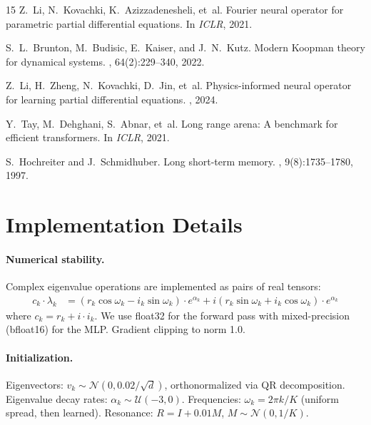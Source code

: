 \documentclass{article}
\begin{document}
\begin{thebibliography}{15}
Z.~Li, N.~Kovachki, K.~Azizzadenesheli, et~al.
\newblock Fourier neural operator for parametric partial differential equations.
\newblock In {\em ICLR}, 2021.

S.~L.~Brunton, M.~Budisic, E.~Kaiser, and J.~N.~Kutz.
\newblock Modern {K}oopman theory for dynamical systems.
, 64(2):229--340, 2022.

Z.~Li, H.~Zheng, N.~Kovachki, D.~Jin, et~al.
\newblock Physics-informed neural operator for learning partial differential equations.
, 2024.

Y.~Tay, M.~Dehghani, S.~Abnar, et~al.
\newblock Long range arena: A benchmark for efficient transformers.
\newblock In {\em ICLR}, 2021.

S.~Hochreiter and J.~Schmidhuber.
\newblock Long short-term memory.
, 9(8):1735--1780, 1997.

\end{thebibliography}

\newpage
\appendix

\section{Implementation Details}
\label{app:implementation}

\paragraph{Numerical stability.}
Complex eigenvalue operations are implemented as pairs of real tensors:
\begin{align}
c_k \cdot \lambda_k &= (r_k \cos\omega_k - i_k \sin\omega_k) \cdot e^{\alpha_k} + i(r_k \sin\omega_k + i_k \cos\omega_k) \cdot e^{\alpha_k}
\end{align}
where $c_k = r_k + i \cdot i_k$. We use float32 for the forward pass with mixed-precision (bfloat16) for the MLP. Gradient clipping to norm 1.0.

\paragraph{Initialization.}
Eigenvectors: $v_k \sim \mathcal{N}(0, 0.02/\sqrt{d})$, orthonormalized via QR decomposition. Eigenvalue decay rates: $\alpha_k \sim \mathcal{U}(-3, 0)$. Frequencies: $\omega_k = 2\pi k / K$ (uniform spread, then learned). Resonance: $R = I + 0.01 M$, $M \sim \mathcal{N}(0, 1/K)$.
\end{document}
